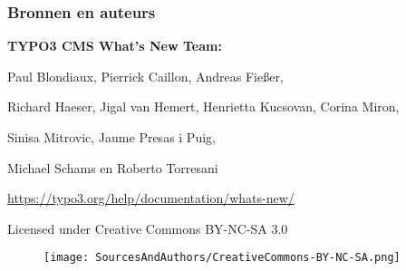 
\begin{frame}[fragile]
	\frametitle{Bronnen en auteurs}

	\vspace{-0.6cm}

	\centerline{\textbf{TYPO3 CMS What's New Team:}}

	\begin{center}
		\centerline{Paul Blondiaux, Pierrick Caillon, Andreas Fießer,}
		\centerline{Richard Haeser, Jigal van Hemert, Henrietta Kucsovan, Corina Miron,}
		\centerline{Sinisa Mitrovic, Jaume Presas i Puig,}
		\centerline{Michael Schams en Roberto Torresani}
	\end{center}

	\vspace{0.3cm}

	\smaller\begin{center}\url{https://typo3.org/help/documentation/whats-new/}\end{center}\normalsize

	\vspace{1cm}

	\smaller\begin{center}Licensed under Creative Commons BY-NC-SA 3.0\end{center}\normalsize
	\begin{figure}\vspace*{-0.4cm}
		\texttt{[image: SourcesAndAuthors/CreativeCommons-BY-NC-SA.png]}
	\end{figure}

\end{frame}

